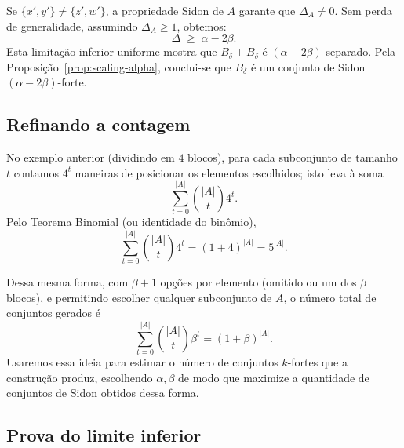 \documentclass[reqno,a4paper,12pt]{amsart}
\begin{document}
Se $\{x',y'\} \neq \{z',w'\}$, a propriedade Sidon de $A$ garante que $\Delta_A \neq 0$. Sem perda de generalidade, assumindo $\Delta_A \geq 1$, obtemos:
\[
  \Delta \;\geq\; \alpha - 2\beta.
\]
Esta limitação inferior uniforme mostra que $B_\delta + B_\delta$ é $(\alpha - 2\beta)$-separado. Pela Proposição~\ref{prop:scaling-alpha}, conclui-se que $B_\delta$ é um conjunto de Sidon $(\alpha-2\beta)$-forte.


\subsection*{Refinando a contagem}

No exemplo anterior (dividindo em \(4\) blocos), para cada subconjunto de tamanho \(t\) contamos \(4^t\) maneiras de posicionar os elementos escolhidos; isto leva à soma
\[
  \sum_{t=0}^{|A|} \binom{|A|}{t} 4^t.
\]
Pelo Teorema Binomial (ou identidade do binômio),
\[
  \sum_{t=0}^{|A|} \binom{|A|}{t} 4^t = (1+4)^{|A|}=5^{|A|}.
\]

Dessa mesma forma, com \(\beta+1\) opções por elemento (omitido ou um dos \(\beta\) blocos), e permitindo escolher qualquer subconjunto de \(A\), o número total de conjuntos gerados é
\[
  \sum_{t=0}^{|A|} \binom{|A|}{t} \beta^t = (1+\beta)^{|A|}.
\]
Usaremos essa ideia para estimar o número de conjuntos \(k\)-fortes que a construção produz,
escolhendo \(\alpha,\beta\) de modo que maximize a quantidade de conjuntos de Sidon obtidos dessa forma.


\subsection{Prova do limite inferior}
\end{document}
